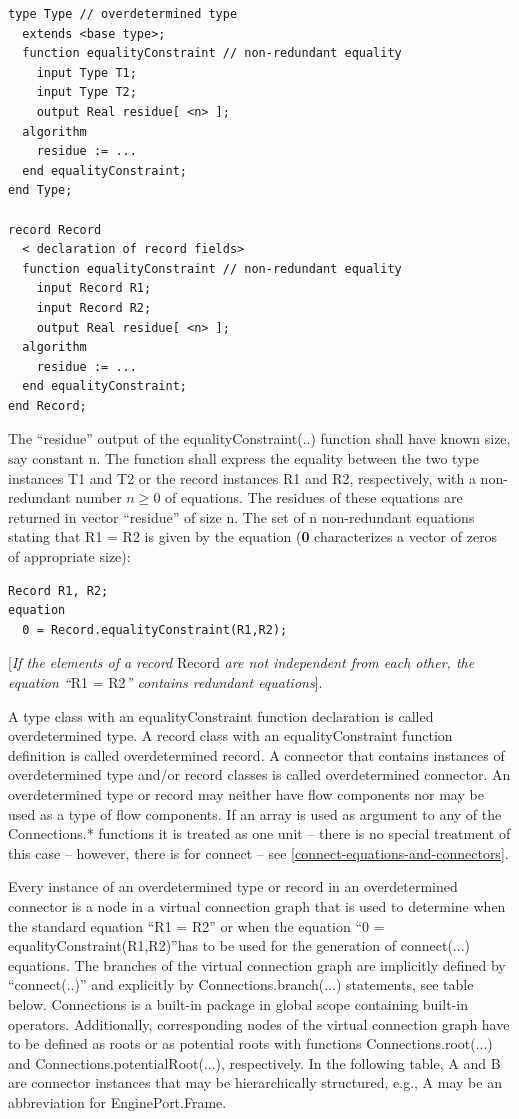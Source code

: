 \documentclass[10pt,a4paper]{report}
\begin{document}
\begin{lstlisting}[language=modelica]
type Type // overdetermined type
  extends <base type>;
  function equalityConstraint // non-redundant equality
    input Type T1;
    input Type T2;
    output Real residue[ <n> ];
  algorithm
    residue := ...
  end equalityConstraint;
end Type;

record Record
  < declaration of record fields>
  function equalityConstraint // non-redundant equality
    input Record R1;
    input Record R2;
    output Real residue[ <n> ];
  algorithm
    residue := ...
  end equalityConstraint;
end Record;
\end{lstlisting}
The ``residue'' output of the equalityConstraint(..) function shall have
known size, say constant n. The function shall express the equality
between the two type instances T1 and T2 or the record instances R1 and
R2, respectively, with a non-redundant number $ n \ge 0$ of equations. The
residues of these equations are returned in vector ``residue'' of size
n. The set of n non-redundant equations stating that R1 = R2 is given by
the equation (\textbf{0} characterizes a vector of zeros of appropriate
size):

\begin{lstlisting}[language=modelica]
  Record R1, R2;
equation
  0 = Record.equalityConstraint(R1,R2);
\end{lstlisting}
{[}\emph{If the elements of a record} Record \emph{are not independent
from each other, the equation ``}R1 = R2\emph{'' contains redundant
equations}{]}.

A type class with an equalityConstraint function declaration is called
overdetermined type. A record class with an equalityConstraint function
definition is called overdetermined record. A connector that contains
instances of overdetermined type and/or record classes is called
overdetermined connector. An overdetermined type or record may neither
have flow components nor may be used as a type of flow components. If an
array is used as argument to any of the Connections.* functions it is
treated as one unit -- there is no special treatment of this case --
however, there is for connect -- see \ref{connect-equations-and-connectors}.

Every instance of an overdetermined type or record in an overdetermined
connector is a node in a virtual connection graph that is used to
determine when the standard equation ``R1 = R2'' or when the equation
``0 = equalityConstraint(R1,R2)''has to be used for the generation of
connect(...) equations. The branches of the virtual connection graph are
implicitly defined by ``connect(..)'' and explicitly by
Connections.branch(...) statements, see table below. Connections is a
built-in package in global scope containing built-in operators.
Additionally, corresponding nodes of the virtual connection graph have
to be defined as roots or as potential roots with functions
Connections.root(...) and Connections.potentialRoot(...), respectively.
In the following table, A and B are connector instances that may be
hierarchically structured, e.g., A may be an abbreviation for
EnginePort.Frame.
\end{document}
